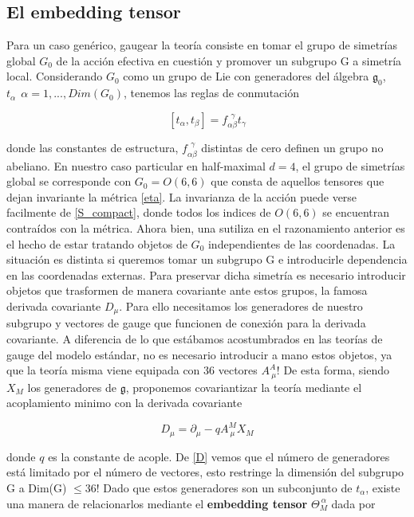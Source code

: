\documentclass{article}
\numberwithin{equation}{section}
\begin{document}
\subsection{El embedding tensor}

Para un caso genérico, gaugear la teoría consiste en tomar el grupo de simetrías global $ G_0 $ de la acción efectiva en cuestión y promover un subgrupo G a simetría local. Considerando $ G_0 $ como un grupo de Lie con generadores del álgebra $ \mathfrak{g}_0 $, $ t_{\alpha} \ \ \alpha=1,..., Dim(G_0)$, tenemos las reglas de conmutación

\begin{equation}\label{algebra}
\left[t_{\alpha}, t_{\beta}\right] = f_{\alpha \beta}^{\ \ \gamma} t_{\gamma}
\end{equation}

donde las constantes de estructura, $ f_{\alpha \beta}^{\ \ \gamma} $ distintas de cero definen un grupo no abeliano. En nuestro caso particular en half-maximal $ d=4 $, el grupo de simetrías global se corresponde con $ G_0=O(6,6) $ que consta de aquellos tensores que dejan invariante la métrica \ref{eta}. La invarianza de la acción puede verse facilmente de \ref{S_compact}, donde todos los indices de $ O(6,6) $ se encuentran contraídos con la métrica. Ahora bien, una sutiliza en el razonamiento anterior es el hecho de estar tratando objetos de $ G_0 $ independientes de las coordenadas. La situación es distinta si queremos tomar un subgrupo  G  e introducirle dependencia en las coordenadas externas. Para preservar dicha simetría es necesario introducir objetos que trasformen de manera covariante ante estos grupos, la famosa derivada covariante $ D_{\mu} $. Para ello necesitamos los generadores de nuestro subgrupo y vectores de gauge que funcionen de conexión para la derivada covariante. A diferencia de lo que estábamos acostumbrados en las teorías de gauge del modelo estándar, no es necesario introducir a mano estos objetos, ya que la teoría misma viene equipada con 36 vectores $ A^A_{\ \mu} $!
De esta forma, siendo $ X_M $ los generadores de $ \mathfrak{g} $, proponemos covariantizar la teoría mediante el acoplamiento minimo con la derivada covariante

\begin{equation}\label{D}
D_{\mu} = \partial_{\mu} - q A^M_{\ \mu} X_M 
\end{equation}

donde $ q $ es la constante de acople. De \ref{D} vemos que el número de generadores está limitado por el número de vectores, esto restringe la dimensión del subgrupo G a Dim(G) $\leq 36 $! Dado que estos generadores son un subconjunto de $ t_{\alpha} $, existe una manera de relacionarlos mediante el \textbf{embedding tensor} $ \Theta_M^{\ \alpha} $ dada por
\end{document}
